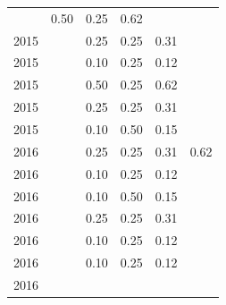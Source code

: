 \begin{table}[H]
\begin{tabular}{| l | c | c | c | c | c |}
          &
          0.50
          &
          0.25
          &
          0.62
          &
          \\
            2015
          &
          
          &
          0.25
          &
          0.25
          &
          0.31
          &
          \\
            2015
          &
          
          &
          0.10
          &
          0.25
          &
          0.12
          &
          \\
            2015
          &
          
          &
          0.50
          &
          0.25
          &
          0.62
          &
          \\
            2015
          &
          
          &
          0.25
          &
          0.25
          &
          0.31
          &
          \\
            2015
          &
          
          &
          0.10
          &
          0.50
          &
          0.15
          &
          \\
\hline
            2016
          &
          
          &
          0.25
          &
          0.25
          &
          0.31
          &
            {\color{blue} 0.62}
          \\
            2016
          &
          
          &
          0.10
          &
          0.25
          &
          0.12
          &
          \\
            2016
          &
          
          &
          0.10
          &
          0.50
          &
          0.15
          &
          \\
            2016
          &
          
          &
          0.25
          &
          0.25
          &
          0.31
          &
          \\
            2016
          &
          
          &
          0.10
          &
          0.25
          &
          0.12
          &
          \\
            2016
          &
          
          &
          0.10
          &
          0.25
          &
          0.12
          &
          \\
            2016
          &
          

\end{tabular}
\end{table}
